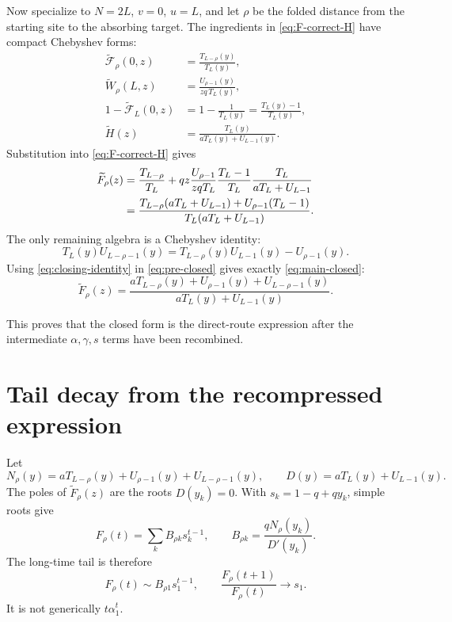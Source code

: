 \documentclass[11pt]{article}
\newcommand{\wt}{\widetilde}
\newcommand{\Fcal}{\mathcal{F}}
\begin{document}
Now specialize to \(N=2L\), \(v=0\), \(u=L\), and let \(\rho\) be the folded
distance from the starting site to the absorbing target.  The ingredients in
\eqref{eq:F-correct-H} have compact Chebyshev forms:
\begin{align}
  \wt{\Fcal}_\rho(0,z)&=\frac{T_{L-\rho}(y)}{T_L(y)},
  \label{eq:F0-rho-compact}\\
  \wt W_\rho(L,z)&=\frac{U_{\rho-1}(y)}{zq\,T_L(y)},
  \label{eq:WrhoL-compact}\\
  1-\wt{\Fcal}_{L}(0,z)&=1-\frac1{T_L(y)}
  =\frac{T_L(y)-1}{T_L(y)},
  \label{eq:one-minus-FL}\\
  \wt H(z)&=\frac{T_L(y)}{aT_L(y)+U_{L-1}(y)}.
  \label{eq:H-compact-again}
\end{align}
Substitution into \eqref{eq:F-correct-H} gives
\begin{align}
  \wt F_\rho(z)
  &=
  \frac{T_{L-\rho}}{T_L}
  +
  qz\frac{U_{\rho-1}}{zqT_L}
  \frac{T_L-1}{T_L}
  \frac{T_L}{aT_L+U_{L-1}}\notag\\
  &=
  \frac{T_{L-\rho}(aT_L+U_{L-1})+U_{\rho-1}(T_L-1)}
  {T_L(aT_L+U_{L-1})}.
  \label{eq:pre-closed}
\end{align}
The only remaining algebra is a Chebyshev identity:
\begin{equation}
  T_L(y)U_{L-\rho-1}(y)
  =
  T_{L-\rho}(y)U_{L-1}(y)-U_{\rho-1}(y).
  \label{eq:closing-identity}
\end{equation}
Using \eqref{eq:closing-identity} in \eqref{eq:pre-closed} gives exactly
\eqref{eq:main-closed}:
\[
  \wt F_\rho(z)=
  \frac{aT_{L-\rho}(y)+U_{\rho-1}(y)+U_{L-\rho-1}(y)}
  {aT_L(y)+U_{L-1}(y)}.
\]

This proves that the closed form is the direct-route expression after the
intermediate \(\alpha,\gamma,s\) terms have been recombined.

\section{Tail decay from the recompressed expression}

Let
\[
  N_\rho(y)=aT_{L-\rho}(y)+U_{\rho-1}(y)+U_{L-\rho-1}(y),
  \qquad
  D(y)=aT_L(y)+U_{L-1}(y).
\]
The poles of \(\wt F_\rho(z)\) are the roots \(D(y_k)=0\).  With
\(s_k=1-q+qy_k\), simple roots give
\begin{equation}
  \boxed{
  F_\rho(t)=\sum_k B_{\rho k}s_k^{t-1},
  \qquad
  B_{\rho k}=\frac{qN_\rho(y_k)}{D'(y_k)}.}
  \label{eq:closed-time}
\end{equation}
The long-time tail is therefore
\begin{equation}
  \boxed{
  F_\rho(t)\sim B_{\rho1}s_1^{t-1},
  \qquad
  \frac{F_\rho(t+1)}{F_\rho(t)}\to s_1.}
  \label{eq:tail}
\end{equation}
It is not generically \(t\alpha_1^t\).
\end{document}
